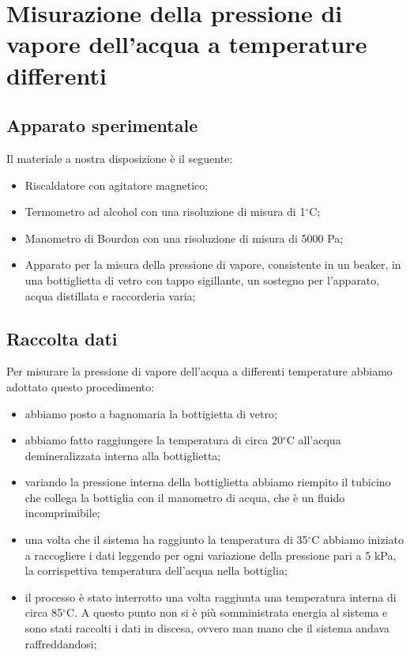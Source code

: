 \section{Misurazione della pressione di vapore dell'acqua a temperature differenti}


\subsection{Apparato sperimentale}

Il materiale a nostra disposizione è il seguente:
\begin{itemize}
	\item{Riscaldatore con agitatore magnetico;}
	\item{Termometro ad alcohol con una risoluzione di misura di 1$^\circ$C;}
	\item{Manometro di Bourdon con una risoluzione di misura di 5000 Pa;}
	\item{Apparato per la misura della pressione di vapore, consistente in un beaker,
    in una bottiglietta di vetro con tappo sigillante, un sostegno per l'apparato, acqua distillata e raccorderia varia;}
\end{itemize}

\subsection{Raccolta dati}

Per misurare la pressione di vapore dell'acqua a differenti temperature abbiamo adottato questo procedimento:

\begin{itemize}
	\item{abbiamo posto a bagnomaria la bottigietta di vetro;}
	\item{abbiamo fatto raggiungere la temperatura di circa 20$^\circ$C all'acqua demineralizzata interna alla bottiglietta;}
	\item{variando la pressione interna della bottiglietta abbiamo riempito il
        tubicino che collega la bottiglia con il manometro di acqua, che è un fluido incomprimibile;}
	\item{una volta che il sistema ha raggiunto la temperatura di 35$^\circ$C abbiamo
        iniziato a raccogliere i dati leggendo per ogni variazione della pressione pari
        a 5 kPa, la corrispettiva temperatura dell'acqua nella bottiglia;}
	\item{il processo è stato interrotto una volta raggiunta una temperatura interna di
        circa 85$^\circ$C. A questo punto non si è più somministrata energia al sistema e sono
        stati raccolti i dati in discesa, ovvero man mano che il sistema andava raffreddandosi;}
\end{itemize}

